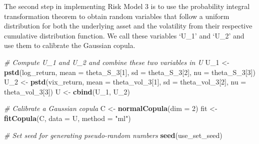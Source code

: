\documentclass[]{article}
\newenvironment{Shaded}{\begin{snugshade}}{\end{snugshade}}
\newcommand{\CommentTok}[1]{\textcolor[rgb]{0.56,0.35,0.01}{\textit{#1}}}
\newcommand{\DataTypeTok}[1]{\textcolor[rgb]{0.13,0.29,0.53}{#1}}
\newcommand{\DecValTok}[1]{\textcolor[rgb]{0.00,0.00,0.81}{#1}}
\newcommand{\KeywordTok}[1]{\textcolor[rgb]{0.13,0.29,0.53}{\textbf{#1}}}
\newcommand{\NormalTok}[1]{#1}
\newcommand{\OperatorTok}[1]{\textcolor[rgb]{0.81,0.36,0.00}{\textbf{#1}}}
\newcommand{\StringTok}[1]{\textcolor[rgb]{0.31,0.60,0.02}{#1}}
\begin{document}
\begin{Shaded}
\end{Shaded}

The second step in implementing Risk Model 3 is to use the probability
integral transformation theorem to obtain random variables that follow a
uniform distribution for both the underlying asset and the volatility
from their respective cumulative distribution function. We call these
variables `U\_1' and `U\_2' and use them to calibrate the Gaussian
copula.

\begin{Shaded}
\begin{Highlighting}[]
\CommentTok{\# Compute \textquotesingle{}U\_1\textquotesingle{} and \textquotesingle{}U\_2\textquotesingle{} and combine these two variables in \textquotesingle{}U\textquotesingle{}}
\NormalTok{U\_}\DecValTok{1}\NormalTok{ <{-}}\StringTok{ }\KeywordTok{pstd}\NormalTok{(log\_return, }\DataTypeTok{mean =}\NormalTok{ theta\_S\_}\DecValTok{3}\NormalTok{[}\DecValTok{1}\NormalTok{], }\DataTypeTok{sd =}\NormalTok{ theta\_S\_}\DecValTok{3}\NormalTok{[}\DecValTok{2}\NormalTok{], }\DataTypeTok{nu =}\NormalTok{ theta\_S\_}\DecValTok{3}\NormalTok{[}\DecValTok{3}\NormalTok{])}
\NormalTok{U\_}\DecValTok{2}\NormalTok{ <{-}}\StringTok{ }\KeywordTok{pstd}\NormalTok{(vix\_return, }\DataTypeTok{mean =}\NormalTok{ theta\_vol\_}\DecValTok{3}\NormalTok{[}\DecValTok{1}\NormalTok{], }\DataTypeTok{sd =}\NormalTok{ theta\_vol\_}\DecValTok{3}\NormalTok{[}\DecValTok{2}\NormalTok{], }\DataTypeTok{nu =}\NormalTok{ theta\_vol\_}\DecValTok{3}\NormalTok{[}\DecValTok{3}\NormalTok{])}
\NormalTok{U   <{-}}\StringTok{ }\KeywordTok{cbind}\NormalTok{(U\_}\DecValTok{1}\NormalTok{, U\_}\DecValTok{2}\NormalTok{)}

\CommentTok{\# Calibrate a Gaussian copula}
\NormalTok{C   <{-}}\StringTok{ }\KeywordTok{normalCopula}\NormalTok{(}\DataTypeTok{dim =} \DecValTok{2}\NormalTok{)}
\NormalTok{fit <{-}}\StringTok{ }\KeywordTok{fitCopula}\NormalTok{(C, }\DataTypeTok{data =}\NormalTok{ U, }\DataTypeTok{method =} \StringTok{"ml"}\NormalTok{)}

\CommentTok{\# Set seed for generating pseudo{-}random numbers}
\KeywordTok{seed}\NormalTok{(use\_set\_seed)}


\end{Highlighting}
\end{Shaded}
\end{document}
